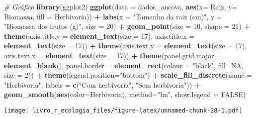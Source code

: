 \documentclass[
]{book}
\newenvironment{Shaded}{\begin{snugshade}}{\end{snugshade}}
\newcommand{\CommentTok}[1]{\textcolor[rgb]{0.56,0.35,0.01}{\textit{#1}}}
\newcommand{\DataTypeTok}[1]{\textcolor[rgb]{0.13,0.29,0.53}{#1}}
\newcommand{\DecValTok}[1]{\textcolor[rgb]{0.00,0.00,0.81}{#1}}
\newcommand{\KeywordTok}[1]{\textcolor[rgb]{0.13,0.29,0.53}{\textbf{#1}}}
\newcommand{\NormalTok}[1]{#1}
\newcommand{\OperatorTok}[1]{\textcolor[rgb]{0.81,0.36,0.00}{\textbf{#1}}}
\newcommand{\OtherTok}[1]{\textcolor[rgb]{0.56,0.35,0.01}{#1}}
\newcommand{\StringTok}[1]{\textcolor[rgb]{0.31,0.60,0.02}{#1}}
\begin{document}
\begin{Shaded}
\begin{Highlighting}[]
\CommentTok{# Gráfico}
\KeywordTok{library}\NormalTok{(ggplot2)}
\KeywordTok{ggplot}\NormalTok{(}\DataTypeTok{data =}\NormalTok{ dados_ancova, }\KeywordTok{aes}\NormalTok{(}\DataTypeTok{x=}\NormalTok{ Raiz, }\DataTypeTok{y=}\NormalTok{ Biomassa, }\DataTypeTok{fill =}\NormalTok{ Herbivoria)) }\OperatorTok{+}\StringTok{ }
\StringTok{  }\KeywordTok{labs}\NormalTok{(}\DataTypeTok{x =} \StringTok{"Tamanho da raiz (cm)"}\NormalTok{, }\DataTypeTok{y =} \StringTok{"Biomassa dos frutos (g)"}\NormalTok{, }\DataTypeTok{size =} \DecValTok{20}\NormalTok{) }\OperatorTok{+}
\StringTok{  }\KeywordTok{geom_point}\NormalTok{(}\DataTypeTok{size =} \DecValTok{10}\NormalTok{, }\DataTypeTok{shape =} \DecValTok{21}\NormalTok{) }\OperatorTok{+}
\StringTok{  }\KeywordTok{theme}\NormalTok{(}\DataTypeTok{axis.title.y =} \KeywordTok{element_text}\NormalTok{(}\DataTypeTok{size =} \DecValTok{17}\NormalTok{), }\DataTypeTok{axis.title.x =} \KeywordTok{element_text}\NormalTok{(}\DataTypeTok{size =} \DecValTok{17}\NormalTok{)) }\OperatorTok{+}
\StringTok{  }\KeywordTok{theme}\NormalTok{(}\DataTypeTok{axis.text.y =} \KeywordTok{element_text}\NormalTok{(}\DataTypeTok{size =} \DecValTok{17}\NormalTok{), }\DataTypeTok{axis.text.x =} \KeywordTok{element_text}\NormalTok{(}\DataTypeTok{size =} \DecValTok{17}\NormalTok{)) }\OperatorTok{+}
\StringTok{  }\KeywordTok{theme}\NormalTok{(}\DataTypeTok{panel.grid.major =} \KeywordTok{element_blank}\NormalTok{(),  }
        \DataTypeTok{panel.border =} \KeywordTok{element_rect}\NormalTok{(}\DataTypeTok{colour =} \StringTok{"black"}\NormalTok{, }\DataTypeTok{fill=}\OtherTok{NA}\NormalTok{, }\DataTypeTok{size =} \DecValTok{2}\NormalTok{)) }\OperatorTok{+}
\StringTok{  }\KeywordTok{theme}\NormalTok{(}\DataTypeTok{legend.position=}\StringTok{"bottom"}\NormalTok{) }\OperatorTok{+}
\StringTok{  }\KeywordTok{scale_fill_discrete}\NormalTok{(}\DataTypeTok{name =} \StringTok{"Herbivoria"}\NormalTok{, }\DataTypeTok{labels =} \KeywordTok{c}\NormalTok{(}\StringTok{"Com herbivoria"}\NormalTok{, }\StringTok{"Sem herbivoria"}\NormalTok{)) }\OperatorTok{+}
\StringTok{  }\KeywordTok{geom_smooth}\NormalTok{(}\KeywordTok{aes}\NormalTok{(}\DataTypeTok{color=}\NormalTok{Herbivoria), }\DataTypeTok{method=}\StringTok{"lm"}\NormalTok{, }\DataTypeTok{show.legend =} \OtherTok{FALSE}\NormalTok{)}
\end{Highlighting}
\end{Shaded}

\texttt{[image: livro\_r\_ecologia\_files/figure-latex/unnamed-chunk-28-1.pdf]}
\end{document}
